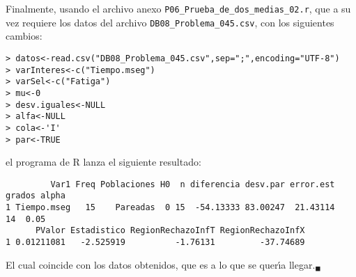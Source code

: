 \begin{solucion}
 Finalmente, usando el archivo anexo
 \texttt{P06\_Prueba\_de\_dos\_medias\_02.r},
 que a su vez requiere los datos del archivo
 \texttt{DB08\_Problema\_045.csv},
 con los siguientes cambios:
 \begin{verbatim}
> datos<-read.csv("DB08_Problema_045.csv",sep=";",encoding="UTF-8")
> varInteres<-c("Tiempo.mseg")
> varSel<-c("Fatiga")
> mu<-0
> desv.iguales<-NULL
> alfa<-NULL
> cola<-'I'
> par<-TRUE
 \end{verbatim}
 \vspace{-0.5cm}
 el programa de R lanza el siguiente resultado:
 \begin{verbatim}
         Var1 Freq Poblaciones H0  n diferencia desv.par error.est grados alpha
1 Tiempo.mseg   15    Pareadas  0 15  -54.13333 83.00247  21.43114     14  0.05
      PValor Estadistico RegionRechazoInfT RegionRechazoInfX
1 0.01211081   -2.525919          -1.76131         -37.74689
 \end{verbatim}
 \vspace{-0.5cm}
 El cual coincide con los datos obtenidos,
 que es a lo que se quer\'{\i}a llegar.${}_{\blacksquare}$
\end{solucion}
